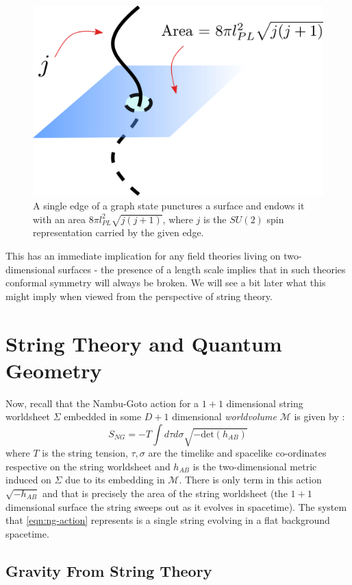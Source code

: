 \documentclass[submission, Phys]{SciPost}
\newcommand{\mc}[1]{\mathcal{#1}}
\begin{document}
\begin{figure}[tbph]
\centering
\includegraphics[width=0.4\linewidth]{area_puncture}
\caption{A single edge of a graph state punctures a surface and endows it with an area $ 8\pi l^2_{PL} \sqrt{j (j + 1)} $, where $ j $ is the $ SU(2) $ spin representation carried by the given edge.}
\label{fig:area-puncture}
\end{figure}


This has an immediate implication for any field theories living on two-dimensional surfaces - the presence of a length scale implies that in such theories conformal symmetry will always be broken. We will see a bit later what this might imply when viewed from the perspective of string theory.

\section{String Theory and Quantum Geometry}\label{sec:string-geometry}

Now, recall that the Nambu-Goto action for a $ 1+1 $ dimensional string worldsheet $ \Sigma $ embedded in some $ D+1 $ dimensional \emph{worldvolume} $ \mc{M} $ is given by \cite{t-Hooft2004Introduction,Tong2010Lectures,Zwiebach2009A-First}:
\begin{equation}\label{eqn:ng-action}
	S_{NG} = -T \int d\tau d\sigma \sqrt{-\text{det} (h_{AB})}
\end{equation}
where $ T $ is the string tension, $ \tau, \sigma $ are the timelike and spacelike co-ordinates respective on the string worldsheet and $ h_{AB} $ is the two-dimensional metric induced on $ \Sigma $ due to its embedding in $ \mc{M} $. There is only term in this action $ \sqrt{-h_{AB}} $ and that is precisely the area of the string worldsheet (the $ 1+1 $ dimensional surface the string sweeps out as it evolves in spacetime). The system that \eqref{eqn:ng-action} represents is a single string evolving in a flat background spacetime.

\subsection{Gravity From String Theory}
\end{document}
